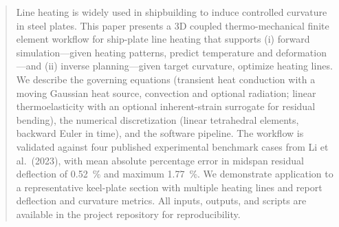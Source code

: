\begin{abstract}
Line heating is widely used in shipbuilding to induce controlled curvature in steel plates. This paper presents a 3D coupled thermo-mechanical finite element workflow for ship-plate line heating that supports (i) forward simulation---given heating patterns, predict temperature and deformation---and (ii) inverse planning---given target curvature, optimize heating lines. We describe the governing equations (transient heat conduction with a moving Gaussian heat source, convection and optional radiation; linear thermoelasticity with an optional inherent-strain surrogate for residual bending), the numerical discretization (linear tetrahedral elements, backward Euler in time), and the software pipeline. The workflow is validated against four published experimental benchmark cases from Li et al.\ (2023), with mean absolute percentage error in midspan residual deflection of \SI{0.52}{\%} and maximum \SI{1.77}{\%}. We demonstrate application to a representative keel-plate section with multiple heating lines and report deflection and curvature metrics. All inputs, outputs, and scripts are available in the project repository for reproducibility.
\end{abstract}
